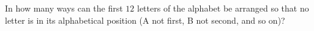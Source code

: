 In how many ways can the first $12$ letters of the alphabet be arranged so that no letter is in its alphabetical position (A not first, B not second, and so on)?
